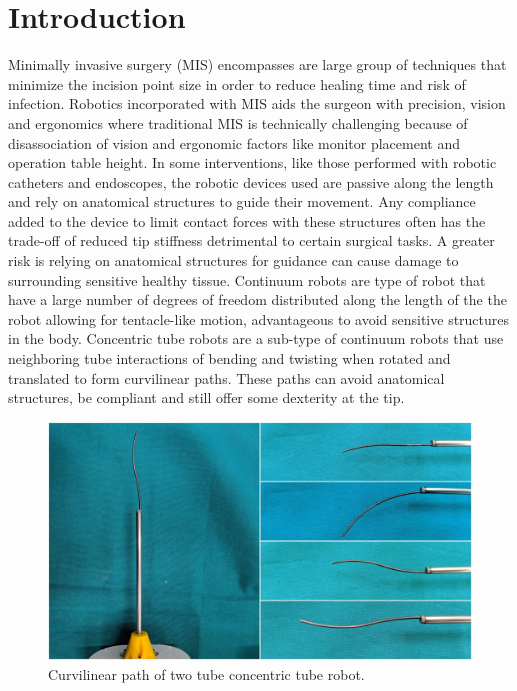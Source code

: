 \section{Introduction}
\label{intro}
Minimally invasive surgery (MIS) encompasses are large group of techniques that minimize the incision point size in order to reduce healing time and risk of infection. Robotics incorporated with MIS aids the surgeon with precision, vision and ergonomics where traditional MIS is technically challenging because of disassociation of vision and ergonomic factors like monitor placement and operation table height. In some interventions, like those performed with robotic catheters and endoscopes, the robotic devices used are passive along the length and rely on anatomical structures to guide their movement. Any compliance added to the device to limit contact forces with these structures often has the trade-off of reduced tip stiffness detrimental to certain surgical tasks. A greater risk is relying on anatomical structures for guidance can cause damage to surrounding sensitive healthy tissue. Continuum robots are type of robot that have a large number of degrees of freedom distributed along the length of the the robot allowing for tentacle-like motion, advantageous to avoid sensitive structures in the body. Concentric tube robots are a sub-type of continuum robots that use neighboring tube interactions of bending and twisting when rotated and translated to form curvilinear paths. These paths can avoid anatomical structures, be compliant and still offer some dexterity at the tip.
\begin{figure}
  \includegraphics[scale=0.15]{fig1.jpg}
\caption{Curvilinear path of two tube concentric tube robot.}
\label{fig:1}
\end{figure}
